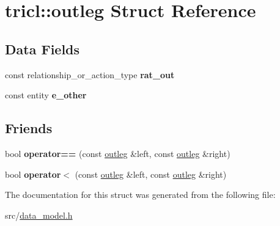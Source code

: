 \hypertarget{structtricl_1_1outleg}{}\section{tricl\+:\+:outleg Struct Reference}
\label{structtricl_1_1outleg}
\subsection*{Data Fields}
\begin{DoxyCompactItemize}
\item 
\mbox{\label{structtricl_1_1outleg_a9d277a290319b2f61d013edf38683552}} 
const relationship\+\_\+or\+\_\+action\+\_\+type {\bfseries rat\+\_\+out}
\item 
\mbox{\label{structtricl_1_1outleg_a33ed4c9c3eabbb90ec66fe005d025ead}} 
const entity {\bfseries e\+\_\+other}
\end{DoxyCompactItemize}
\subsection*{Friends}
\begin{DoxyCompactItemize}
\item 
\mbox{\label{structtricl_1_1outleg_a925572d2a4bc56d312134f995f7790a5}} 
bool {\bfseries operator==} (const \hyperlink{structtricl_1_1outleg}{outleg} \&left, const \hyperlink{structtricl_1_1outleg}{outleg} \&right)
\item 
\mbox{\label{structtricl_1_1outleg_a594b6be76b1271da95305f64d3f28f52}} 
bool {\bfseries operator$<$} (const \hyperlink{structtricl_1_1outleg}{outleg} \&left, const \hyperlink{structtricl_1_1outleg}{outleg} \&right)
\end{DoxyCompactItemize}


The documentation for this struct was generated from the following file\+:\begin{DoxyCompactItemize}
\item 
src/\hyperlink{data__model_8h}{data\+\_\+model.\+h}\end{DoxyCompactItemize}
